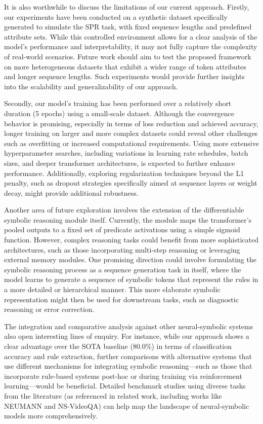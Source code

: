 \documentclass{article}
\begin{document}
It is also worthwhile to discuss the limitations of our current approach. Firstly, our experiments have been conducted on a synthetic dataset specifically generated to simulate the SPR task, with fixed sequence lengths and predefined attribute sets. While this controlled environment allows for a clear analysis of the model’s performance and interpretability, it may not fully capture the complexity of real-world scenarios. Future work should aim to test the proposed framework on more heterogeneous datasets that exhibit a wider range of token attributes and longer sequence lengths. Such experiments would provide further insights into the scalability and generalizability of our approach.

Secondly, our model’s training has been performed over a relatively short duration (5 epochs) using a small-scale dataset. Although the convergence behavior is promising, especially in terms of loss reduction and achieved accuracy, longer training on larger and more complex datasets could reveal other challenges such as overfitting or increased computational requirements. Using more extensive hyperparameter searches, including variations in learning rate schedules, batch sizes, and deeper transformer architectures, is expected to further enhance performance. Additionally, exploring regularization techniques beyond the L1 penalty, such as dropout strategies specifically aimed at sequence layers or weight decay, might provide additional robustness.

Another area of future exploration involves the extension of the differentiable symbolic reasoning module itself. Currently, the module maps the transformer’s pooled outputs to a fixed set of predicate activations using a simple sigmoid function. However, complex reasoning tasks could benefit from more sophisticated architectures, such as those incorporating multi-step reasoning or leveraging external memory modules. One promising direction could involve formulating the symbolic reasoning process as a sequence generation task in itself, where the model learns to generate a sequence of symbolic tokens that represent the rules in a more detailed or hierarchical manner. This more elaborate symbolic representation might then be used for downstream tasks, such as diagnostic reasoning or error correction.

The integration and comparative analysis against other neural-symbolic systems also open interesting lines of enquiry. For instance, while our approach shows a clear advantage over the SOTA baseline (80.0\%) in terms of classification accuracy and rule extraction, further comparisons with alternative systems that use different mechanisms for integrating symbolic reasoning—such as those that incorporate rule-based systems post-hoc or during training via reinforcement learning—would be beneficial. Detailed benchmark studies using diverse tasks from the literature (as referenced in related work, including works like NEUMANN and NS-VideoQA) can help map the landscape of neural-symbolic models more comprehensively.
\end{document}
